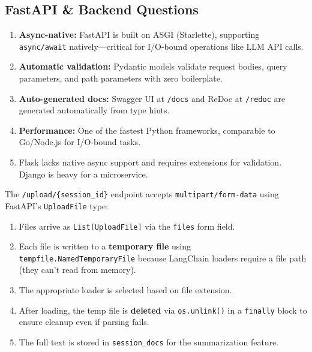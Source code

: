 \documentclass[12pt,a4paper]{article}
\begin{document}
\subsection{FastAPI \& Backend Questions}

\begin{interviewbox}
\end{interviewbox}
\begin{answerbox}
\begin{enumerate}
  \item \textbf{Async-native:} FastAPI is built on ASGI (Starlette), supporting \texttt{async/await} natively—critical for I/O-bound operations like LLM API calls.
  \item \textbf{Automatic validation:} Pydantic models validate request bodies, query parameters, and path parameters with zero boilerplate.
  \item \textbf{Auto-generated docs:} Swagger UI at \texttt{/docs} and ReDoc at \texttt{/redoc} are generated automatically from type hints.
  \item \textbf{Performance:} One of the fastest Python frameworks, comparable to Go/Node.js for I/O-bound tasks.
  \item Flask lacks native async support and requires extensions for validation. Django is heavy for a microservice.
\end{enumerate}
\end{answerbox}

\begin{interviewbox}
\end{interviewbox}
\begin{answerbox}
The \texttt{/upload/\{session\_id\}} endpoint accepts \texttt{multipart/form-data} using FastAPI's \texttt{UploadFile} type:
\begin{enumerate}
  \item Files arrive as \texttt{List[UploadFile]} via the \texttt{files} form field.
  \item Each file is written to a \textbf{temporary file} using \texttt{tempfile.NamedTemporaryFile} because LangChain loaders require a file path (they can't read from memory).
  \item The appropriate loader is selected based on file extension.
  \item After loading, the temp file is \textbf{deleted} via \texttt{os.unlink()} in a \texttt{finally} block to ensure cleanup even if parsing fails.
  \item The full text is stored in \texttt{session\_docs} for the summarization feature.
\end{enumerate}
\end{answerbox}
\end{document}
